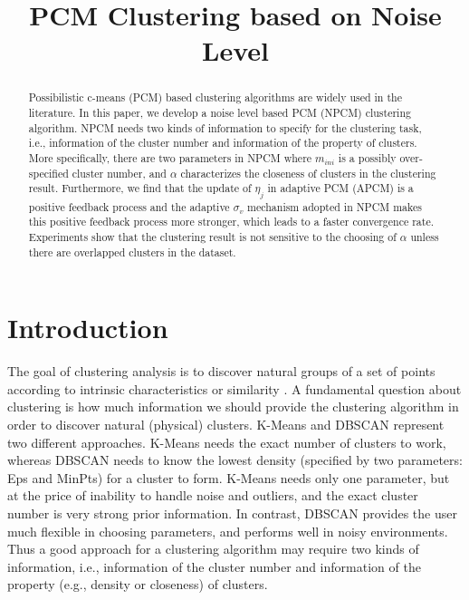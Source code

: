 \documentclass[conference]{IEEEtran}
\date{}
\title{PCM Clustering based on Noise Level}
\theoremstyle{definition}
\begin{document}
\maketitle


\begin{abstract}
Possibilistic c-means (PCM) based clustering algorithms are widely used in the literature. In this paper, we develop a noise level based PCM (NPCM) clustering algorithm. NPCM needs two kinds of information to specify for the clustering task, i.e., information of the cluster number and information of the property of clusters. More specifically, there are two parameters in NPCM where $m_{ini}$ is a possibly over-specified cluster number, and $\alpha$ characterizes the closeness of clusters in the clustering result. Furthermore, we find that the update of $\eta_j$ in adaptive PCM (APCM) is a positive feedback process and the adaptive $\sigma_v$ mechanism adopted in NPCM makes this positive feedback process more stronger, which leads to a faster convergence rate. Experiments show that the clustering result is not sensitive to the choosing of $\alpha$ unless there are overlapped clusters in the dataset.
\end{abstract}
\section{Introduction}
\label{sec-1}
The goal of clustering analysis is to discover natural groups of a set of points according to intrinsic characteristics or similarity \cite{jain_data_2010}. A fundamental question about clustering is how much information we should provide the clustering algorithm in order to discover natural (physical) clusters. K-Means \cite{jain_data_2010} and DBSCAN \cite{ester_density-based_1996} represent two different approaches. K-Means needs the exact number of clusters to work, whereas DBSCAN needs to know the lowest density (specified by two parameters: Eps and MinPts) for a cluster to form. K-Means needs only one parameter, but at the price of inability to handle noise and outliers, and the exact cluster number is very strong prior information. In contrast, DBSCAN provides the user much flexible in choosing parameters, and performs well in noisy environments.
Thus a good approach for a clustering algorithm may require two kinds of information, i.e., information of the cluster number and information of the property (e.g., density or closeness) of clusters.
\end{document}
